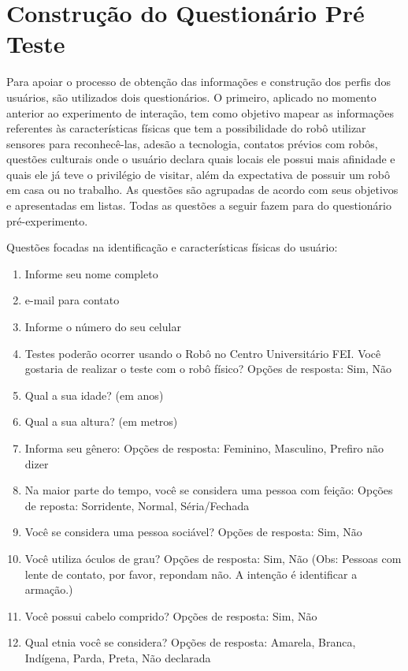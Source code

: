 \section{Construção do Questionário Pré Teste}
\label{sec:questionariopreteste}
Para apoiar o processo de obtenção das informações e construção dos perfis dos usuários, são utilizados dois questionários. O primeiro, aplicado no momento anterior ao experimento de interação, tem como objetivo mapear as informações referentes às características físicas que tem a possibilidade do robô utilizar sensores para reconhecê-las, adesão a tecnologia, contatos prévios com robôs, questões culturais onde o usuário declara quais locais ele possui mais afinidade e quais ele já teve o privilégio de visitar, além da expectativa de possuir um robô em casa ou no trabalho. As questões são agrupadas de acordo com seus objetivos e apresentadas em listas. Todas as questões a seguir fazem para do questionário pré-experimento.

Questões focadas na identificação e características físicas do usuário:

\begin{enumerate}
	\item Informe seu nome completo
	\item e-mail para contato
	\item Informe o número do seu celular
	\item Testes poderão ocorrer usando o Robô no Centro Universitário FEI. Você gostaria de realizar o teste com o robô físico? Opções de resposta: Sim, Não
	\item Qual a sua idade? (em anos)
	\item Qual a sua altura? (em metros)
	\item Informa seu gênero: Opções de resposta: Feminino, Masculino, Prefiro não dizer
	\item Na maior parte do tempo, você se considera uma pessoa com feição: Opções de reposta: Sorridente, Normal, Séria/Fechada
	\item Você se considera uma pessoa sociável? Opções de resposta: Sim, Não
	\item Você utiliza óculos de grau? Opções de resposta: Sim, Não (Obs: Pessoas com lente de contato, por favor, repondam não. A intenção é identificar a armação.)
	\item Você possui cabelo comprido? Opções de resposta: Sim, Não
	\item Qual etnia você se considera? Opções de resposta: Amarela, Branca, Indígena, Parda, Preta, Não declarada
\end{enumerate}

